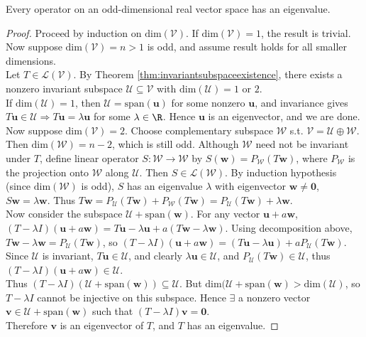\begin{theorem} Every operator on an odd-dimensional real vector space has an eigenvalue.
\begin{proof} Proceed by induction on $\text{dim}(\mathcal{V})$. If $\text{dim}(\mathcal{V}) = 1$, the result is trivial.\\
Now suppose $\text{dim}(\mathcal{V}) = n > 1$ is odd, and assume result holds for all smaller dimensions.\\
Let $T \in \mathcal{L}(\mathcal{V})$. By Theorem \ref{thm:invariantsubspaceexistence}, there exists a nonzero invariant subspace $\mathcal{U} \subseteq \mathcal{V}$ with $\text{dim}(\mathcal{U}) = 1$ or $2$.\\
If $\text{dim}(\mathcal{U}) = 1$, then $\mathcal{U} = \text{span}(\mathbf{u})$ for some nonzero $\mathbf{u}$, and invariance gives $T \mathbf{u} \in \mathcal{U} \Rightarrow T \mathbf{u} = \lambda \mathbf{u}$ for some $\lambda \in \R$. Hence $\mathbf{u}$ is an eigenvector, and we are done.\\
Now suppose $\text{dim}(\mathcal{V}) = 2$. Choose complementary subspace $\mathcal{W}$ s.t. $\mathcal{V} = \mathcal{U} \oplus \mathcal{W}$. Then $\text{dim}(\mathcal{W}) = n-2$, which is still odd. Although $\mathcal{W}$ need not be invariant under $T$, define linear operator $S: \mathcal{W} \rightarrow \mathcal{W}$ by $S(\mathbf{w}) = P_{\mathcal{W}}(T \mathbf{w})$, where $P_{\mathcal{W}}$ is the projection onto $\mathcal{W}$ along $\mathcal{U}$. Then $S \in \mathcal{L}(\mathcal{W})$. By induction hypothesis (since $\text{dim}(\mathcal{W})$ is odd), $S$ has an eigenvalue $\lambda$ with eigenvector $\mathbf{w} \neq \mathbf{0}$, $S \mathbf{w} = \lambda \mathbf{w}$. Thus $T \mathbf{w} = P_{\mathcal{U}}(T \mathbf{w}) + P_{\mathcal{W}}(T \mathbf{w}) = P_{\mathcal{U}}(T \mathbf{w}) + \lambda \mathbf{w}$.\\
Now consider the subspace $\mathcal{U} + \text{span}(\mathbf{w})$. For any vector $\mathbf{u} + a \mathbf{w}$, $(T - \lambda I)(\mathbf{u} + a \mathbf{w}) = T \mathbf{u} - \lambda \mathbf{u} + a(T \mathbf{w} - \lambda \mathbf{w})$. Using decomposition above, $T\mathbf{w} - \lambda \mathbf{w} = P_{\mathcal{U}}(T \mathbf{w})$, so $(T - \lambda I)(\mathbf{u} + a \mathbf{w}) = (T \mathbf{u} - \lambda \mathbf{u}) + a P_{\mathcal{U}}(T \mathbf{w})$.\\
Since $\mathcal{U}$ is invariant, $T \mathbf{u} \in \mathcal{U}$, and clearly $\lambda \mathbf{u} \in \mathcal{U}$, and $P_{\mathcal{U}}(T \mathbf{w}) \in \mathcal{U}$, thus $(T - \lambda I)(\mathbf{u} + a \mathbf{w}) \in \mathcal{U}$.\\
Thus $(T - \lambda I)(\mathcal{U} + \text{span}(\mathbf{w})) \subseteq \mathcal{U}$. But $\text{dim}(\mathcal{U} + \text{span}(\mathbf{w}) > \text{dim}(\mathcal{U})$, so $T - \lambda I$ cannot be injective on this subspace. Hence $\exists$ a nonzero vector $\mathbf{v} \in \mathcal{U} + \text{span}(\mathbf{w})$ such that $(T - \lambda I)\mathbf{v} = \mathbf{0}$.\\
Therefore $\mathbf{v}$ is an eigenvector of $T$, and $T$ has an eigenvalue.
\end{proof}
\end{theorem}

